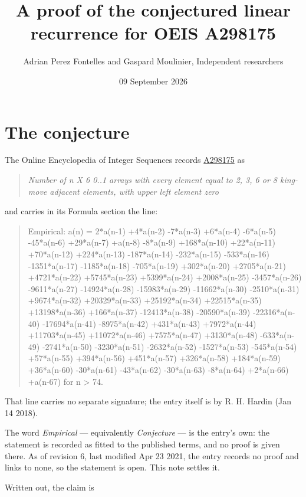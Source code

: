 \documentclass[11pt]{article}
\title{A proof of the conjectured linear recurrence for OEIS A298175}
\author{Adrian Perez Fontelles and Gaspard Moulinier, Independent researchers}
\date{09 September 2026}
\theoremstyle{definition}
\begin{document}
\maketitle
\section{The conjecture}

The Online Encyclopedia of Integer Sequences records \href{https://oeis.org/A298175}{A298175} as

\begin{quote}\itshape Number of n X 6 0..1 arrays with every element equal to 2, 3, 6 or 8 king-move adjacent elements, with upper left element zero\end{quote}

and carries in its Formula section the line:

\begin{quote}\ttfamily Empirical: a(n) = 2*a(n-1) +4*a(n-2) -7*a(n-3) +6*a(n-4) -6*a(n-5) -45*a(n-6) +29*a(n-7) +a(n-8) -8*a(n-9) +168*a(n-10) +22*a(n-11) +70*a(n-12) +224*a(n-13) -187*a(n-14) -232*a(n-15) -533*a(n-16) -1351*a(n-17) -1185*a(n-18) -705*a(n-19) +302*a(n-20) +2705*a(n-21) +4721*a(n-22) +5745*a(n-23) +5399*a(n-24) +2008*a(n-25) -3457*a(n-26) -9611*a(n-27) -14924*a(n-28) -15983*a(n-29) -11662*a(n-30) -2510*a(n-31) +9674*a(n-32) +20329*a(n-33) +25192*a(n-34) +22515*a(n-35) +13198*a(n-36) +166*a(n-37) -12413*a(n-38) -20590*a(n-39) -22316*a(n-40) -17694*a(n-41) -8975*a(n-42) +431*a(n-43) +7972*a(n-44) +11703*a(n-45) +11072*a(n-46) +7575*a(n-47) +3130*a(n-48) -633*a(n-49) -2741*a(n-50) -3230*a(n-51) -2632*a(n-52) -1527*a(n-53) -545*a(n-54) +57*a(n-55) +394*a(n-56) +451*a(n-57) +326*a(n-58) +184*a(n-59) +36*a(n-60) -30*a(n-61) -43*a(n-62) -30*a(n-63) -8*a(n-64) +2*a(n-66) +a(n-67) for n > 74.\end{quote}

That line carries no separate signature; the entry itself is by R. H. Hardin (Jan 14 2018).

The word {\itshape Empirical} --- equivalently {\itshape Conjecture} --- is the entry's own: the statement is recorded as fitted to the published terms, and no proof is given there. As of revision 6, last modified Apr 23 2021, the entry records no proof and links to none, so the statement is open. This note settles it.

Written out, the claim is
\end{document}
